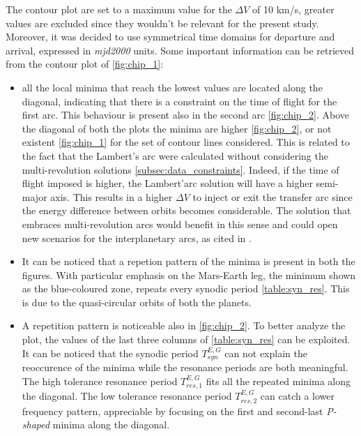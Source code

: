 
The contour plot are set to a maximum value for the $\Delta V$ of 10 km/s, greater values are excluded since they wouldn't be relevant for the present study. Moreover, it was decided to use symmetrical time domains for departure and arrival, expressed in \textit{mjd2000} units. 
Some important information can be retrieved from the contour plot of \autoref{fig:chip_1}:
\begin{itemize}
    [wide,itemsep=3pt,topsep=3pt]
    \item all the local minima that reach the lowest values are located along the diagonal, indicating that there is a constraint on the time of flight for the first arc. This behaviour is present also in the second arc \autoref{fig:chip_2}. Above the diagonal of both the plots the minima are higher \autoref{fig:chip_2}, or not existent \autoref{fig:chip_1} for the set of contour lines considered. This is related to the fact that the Lambert's arc were calculated without considering the multi-revolution solutions \autoref{subsec:data_constraints}. Indeed, if the time of flight imposed is higher, the Lambert'arc solution will have a higher semi-major axis. This results in a higher $\Delta V$ to inject or exit the transfer arc since the energy difference between orbits becomes considerable. The solution that embraces multi-revolution arcs would benefit in this sense and could open new scenarios for the interplanetary arcs, as cited in \cite{phd_menzio}.
    \item It can be noticed that a repetion pattern of the minima is present in both the figures. With particular emphasis on the Mars-Earth leg, the minimum shown as the blue-coloured zone, repeats every synodic period \autoref{table:syn_res}. This is due to the quasi-circular orbits of both the planets. 
    \item A repetition pattern is noticeable also in \autoref{fig:chip_2}. To better analyze the plot, the values of the last three columns of \autoref{table:syn_res} can be exploited. It can be noticed that the synodic period $T_{syn}^{E,G}$  can not explain the reoccurence of the minima while the resonance periods are both meaningful. The high tolerance resonance period $T_{res,1}^{E,G}$ fits all the repeated minima along the diagonal. The low tolerance resonance period $T_{res,2}^{E,G}$ can catch a lower frequency pattern, appreciable by focusing on the first and second-last \textit{P-shaped} minima along the diagonal.

\end{itemize}
